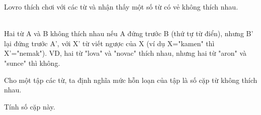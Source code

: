 Lovro thích chơi với các từ và nhận thấy một số từ có vẻ không thích nhau.


\\Hai từ A và B không thích nhau nếu A đứng trước B (thứ tự từ điển), nhưng B' lại đứng trước A', với X' từ viết ngược của X (ví dụ X="kamen" thì X'="nemak"). VD, hai từ "lova" và "novac" thích nhau, nhưng hai từ "aron" và "sunce" thì không.

Cho một tập các từ, ta định nghĩa mức hỗn loạn của tập là số cặp từ không thích nhau.

Tính số cặp này.

\